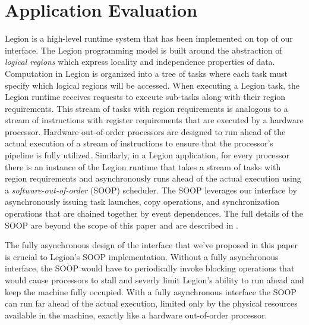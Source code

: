 
\section{Application Evaluation}
\label{sec:apps}
Legion is a high-level runtime system that has been implemented on top
of our interface\cite{Legion12}.  
The Legion programming model is built around the abstraction of 
{\em logical regions} which express locality and independence properties 
of data.  Computation in Legion is organized into a tree of tasks where 
each task must specify which logical regions will be accessed.
When executing a Legion task, the Legion runtime receives requests
to execute sub-tasks along with their region requirements.
This stream of tasks with region requirements is analogous to a stream
of instructions with register requirements that are executed by 
a hardware processor.  Hardware out-of-order processors are designed to
run ahead of the actual execution of a stream of instructions
to ensure that the processor's pipeline is fully utilized.  Similarly, in a
Legion application, for every processor there is an instance of the Legion runtime
that takes a stream of tasks with region requirements and asynchronously
runs ahead of the actual execution using a {\em software-out-of-order} (SOOP)
scheduler.  The SOOP leverages our interface by asynchronously issuing task launches, copy
operations, and synchronization operations that are chained together by
event dependences.  The full details of the SOOP are beyond the scope of this paper
and are described in \cite{Legion12}.

The fully asynchronous design of the interface that we've proposed in
this paper is crucial to Legion's SOOP implementation.  Without a fully
asynchronous interface, the SOOP would have to periodically invoke
blocking operations that would cause processors to stall and severly
limit Legion's ability to run ahead and keep the machine fully
occupied.  With a fully asynchronous interface the SOOP can run
far ahead of the actual execution, limited only by the physical resources
available in the machine, exactly like a hardware out-of-order processor.


